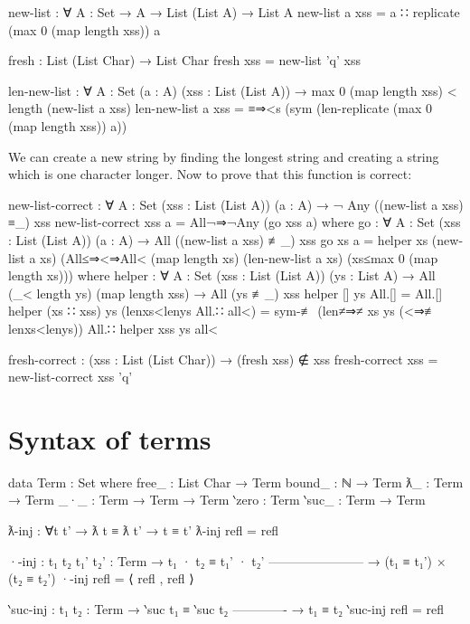 \begin{code}
  new-list : ∀ {A : Set} → A → List (List A) → List A
  new-list a xss = a ∷ replicate (max 0 (map length xss)) a

  fresh : List (List Char) → List Char
  fresh xss = new-list 'q' xss

  len-new-list : ∀ {A : Set} (a : A) (xss : List (List A))
    → max 0 (map length xss) < length (new-list a xss)
  len-new-list a xss =
    ≡⇒<s (sym (len-replicate (max 0 (map length xss)) a))
\end{code}

We can create a new string by finding the longest string and creating a string which is one
character longer. Now to prove that this function is correct:

\begin{code}
  new-list-correct :
    ∀ {A : Set} (xss : List (List A)) (a : A)
    → ¬ Any ((new-list a xss) ≡_) xss
  new-list-correct xss a = All¬⇒¬Any (go xss a)
    where
      go : ∀ {A : Set} (xss : List (List A)) (a : A)
        → All ((new-list a xss) ≢_) xss
      go xs a =
        helper
          xs
          (new-list a xs)
          (All≤⇒<⇒All<
            (map length xs)
            (len-new-list a xs)
            (xs≤max 0 (map length xs)))
        where
          helper : ∀ {A : Set} (xss : List (List A)) (ys : List A)
            → All (_< length ys) (map length xss)
            → All (ys ≢_) xss
          helper [] ys All.[] = All.[]
          helper (xs ∷ xss) ys (lenxs<lenys All.∷ all<) =
            sym-≢ (len≠⇒≠ xs ys (<⇒≢ lenxs<lenys))
              All.∷ helper xss ys all<

  fresh-correct : (xss : List (List Char)) → (fresh xss) ∉ xss
  fresh-correct xss = new-list-correct xss 'q'
\end{code}

\section{Syntax of terms}
\label{appendix:stlc_terms}
\begin{code}
  data Term : Set where
    free_  : List Char → Term
    bound_ : ℕ → Term
    ƛ_     : Term → Term
    _·_    : Term → Term → Term
    ‵zero  : Term
    ‵suc_  : Term → Term

  ƛ-inj : ∀{t t'} → ƛ t ≡ ƛ t' → t ≡ t'
  ƛ-inj refl = refl

  ·-inj : {t₁ t₂ t₁' t₂' : Term}
    → t₁ · t₂ ≡ t₁' · t₂'
      -----------------------
    → (t₁ ≡ t₁') × (t₂ ≡ t₂')
  ·-inj refl = ⟨ refl , refl ⟩

  ‵suc-inj : {t₁ t₂ : Term}
    → ‵suc t₁ ≡ ‵suc t₂
      -------------
    → t₁ ≡ t₂
  ‵suc-inj refl = refl
\end{code}

